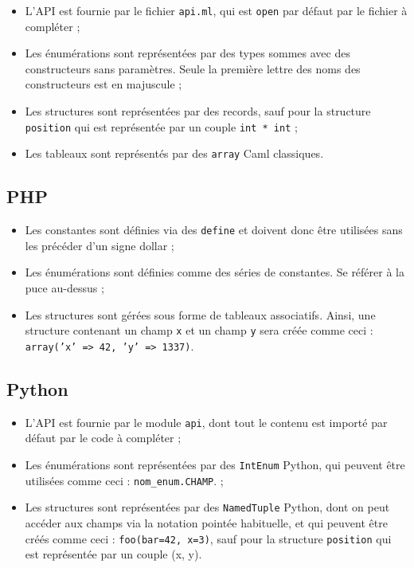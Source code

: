 \begin{itemize}
\item{L'API est fournie par le fichier \texttt{api.ml}, qui est \texttt{open}
      par défaut par le fichier à compléter ;}
\item{Les énumérations sont représentées par des types sommes avec des
      constructeurs sans paramètres. Seule la première lettre des noms des
      constructeurs est en majuscule ;}

\item{Les structures sont représentées par des records, sauf pour la structure
      \texttt{position} qui est représentée par un couple \texttt{int * int} ;}
\item{Les tableaux sont représentés par des \texttt{array} Caml classiques.}
\end{itemize}

\subsection{PHP}

\begin{itemize}
\item{Les constantes sont définies via des \texttt{define} et doivent donc être
      utilisées sans les précéder d'un signe dollar ;}
\item{Les énumérations sont définies comme des séries de constantes. Se référer
      à la puce au-dessus ;}
\item{Les structures sont gérées sous forme de tableaux associatifs. Ainsi, une
      structure contenant un champ \texttt{x} et un champ \texttt{y} sera créée
      comme ceci : \texttt{array('x' => 42, 'y' => 1337)}.}
\end{itemize}

\subsection{Python}

\begin{itemize}
\item{L'API est fournie par le module \texttt{api}, dont tout le contenu est
      importé par défaut par le code à compléter ;}
\item{Les énumérations sont représentées par des \texttt{IntEnum} Python, qui
      peuvent être utilisées comme ceci : \texttt{nom\_enum.CHAMP}. ;}
\item{Les structures sont représentées par des \texttt{NamedTuple} Python, dont
      on peut accéder aux champs via la notation pointée habituelle, et
      qui peuvent être créés comme ceci : \texttt{foo(bar=42, x=3)}, sauf pour
      la structure \texttt{position} qui est représentée par un couple (x, y).}
\end{itemize}

